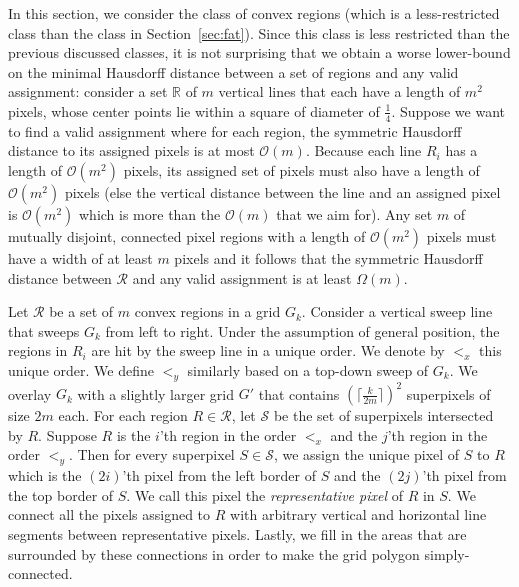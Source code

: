\documentclass[a4paper,UKenglish,cleveref]{lipics-v2019}
\begin{document}
In this section, we consider the class of convex regions (which is a less-restricted class than the class in Section~\ref{sec:fat}). Since this class is less restricted than the previous discussed classes, it is not surprising that we obtain a worse lower-bound on the minimal Hausdorff distance between a set of regions and any valid assignment: consider a set $\mathbb{R}$ of $m$ vertical lines that each have a length of $m^2$ pixels, whose center points lie within a square of diameter of $\frac{1}{4}$. Suppose we want to find a valid assignment where for each region, the symmetric Hausdorff distance to its assigned pixels is at most $\mathcal{O}(m)$. Because each line $R_i$ has a length of $\mathcal{O}(m^2)$ pixels, its assigned set of pixels must also have a length of $\mathcal{O}(m^2)$ pixels (else the vertical distance between the line and an assigned pixel is $\mathcal{O}(m^2)$ which is more than the $\mathcal{O}(m)$ that we aim for). Any set $m$ of mutually disjoint, connected pixel regions with a length of $\mathcal{O}(m^2)$ pixels must have a width of at least $m$ pixels and it follows that the symmetric Hausdorff distance between $\mathcal{R}$ and any valid assignment is at least $\Omega(m)$.

Let $\mathcal{R}$ be a set of $m$ convex regions in a grid $G_k$. Consider a vertical sweep line that sweeps $G_k$ from left to right. Under the assumption of general position, the regions in $R_i$ are hit by the sweep line in a unique order. We denote by $<_x$ this unique order. We define $<_y$ similarly based on a top-down sweep of $G_k$. We overlay $G_k$ with a slightly larger grid $G'$ that contains $(\lceil \frac{k}{2m} \rceil)^2$ superpixels of size $2m$ each. For each region $R \in \mathcal{R}$, let $\mathcal{S}$ be the set of superpixels intersected by $R$. Suppose $R$ is the $i$'th region in the order $<_x$ and the $j$'th region in the order $<_y$. Then for every superpixel $S \in \mathcal{S}$, we assign the unique pixel of $S$ to $R$ which is the $(2i)$'th pixel from the left border of $S$ and the $(2j)$'th pixel from the top border of $S$. We call this pixel the \emph{representative pixel} of $R$ in $S$. We connect all the pixels assigned to $R$ with arbitrary vertical and horizontal line segments between representative pixels.
Lastly, we fill in the areas that are surrounded by these connections in order to make the grid polygon simply-connected.
\end{document}
